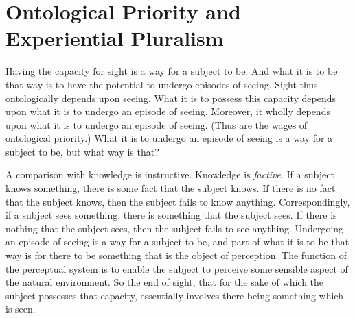 \documentclass[12pt]{article}
\begin{document}

\section{Ontological Priority and Experiential Pluralism} %
\label{sec:ontological_dependence_and_experiential_pluralism}

Having the capacity for sight is a way for a subject to be. And what it is to be that way is to have the potential to undergo episodes of seeing. Sight thus ontologically depends upon seeing. What it is to possess this capacity depends upon what it is to undergo an episode of seeing. Moreover, it wholly depends upon what it is to undergo an episode of seeing. (Thus are the wages of ontological priority.) What it is to undergo an episode of seeing is a way for a subject to be, but what way is that?

A comparison with knowledge is instructive. Knowledge is \emph{factive}. If a subject knows something, there is some fact that the subject knows. If there is no fact that the subject knows, then the subject fails to know anything. Correspondingly, if a subject sees something, there is something that the subject sees. If there is nothing that the subject sees, then the subject fails to see anything. Undergoing an episode of seeing is a way for a subject to be, and part of what it is to be that way is for there to be something that is the object of perception. The function of the perceptual system is to enable the subject to perceive some sensible aspect of the natural environment. So the end of sight, that for the sake of which the subject possesses that capacity, essentially involves there being something which is seen.
\end{document}

